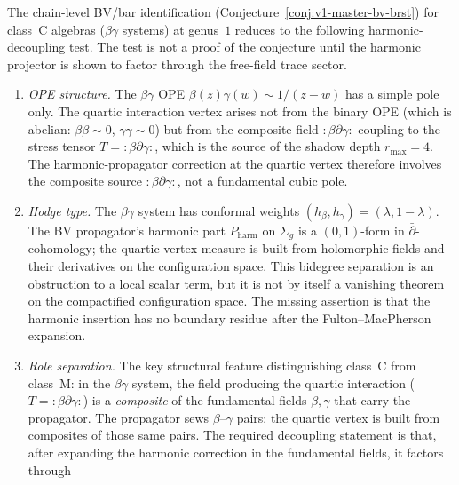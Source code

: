 \begin{remark}%
\label{rem:bv-bar-class-c-proof}%
%
%
%
The chain-level BV/bar identification
(Conjecture~\ref{conj:v1-master-bv-brst})
for class~C algebras ($\beta\gamma$ systems) at genus~$1$ reduces to
the following harmonic-decoupling test. The test is not a proof of the
conjecture until the harmonic projector is shown to factor through the
free-field trace sector.
\begin{enumerate}[label=\textup{(\roman*)},nosep]
\item \emph{OPE structure.}
 The $\beta\gamma$ OPE $\beta(z)\gamma(w)
 \sim 1/(z{-}w)$ has a simple pole only.
 The quartic interaction vertex arises not from the
 binary OPE (which is abelian: $\beta\beta \sim 0$,
 $\gamma\gamma \sim 0$) but from the composite field
 $:\!\beta\partial\gamma\!:$ coupling to the stress tensor
 $T = :\!\beta\partial\gamma\!:$, which is the source of the
 shadow depth $r_{\max} = 4$.
 The harmonic-propagator correction at the quartic vertex
 therefore involves the composite source
 $:\!\beta\partial\gamma\!:$, not a fundamental cubic pole.
\item \emph{Hodge type.}
 The $\beta\gamma$ system has conformal weights
 $(h_\beta, h_\gamma) = (\lambda, 1{-}\lambda)$.
 The BV propagator's harmonic part $P_{\mathrm{harm}}$
 on $\Sigma_g$ is a $(0,1)$-form in
 $\bar\partial$-cohomology;
 the quartic vertex measure is built from holomorphic fields and their
 derivatives on the configuration space. This bidegree separation is an
 obstruction to a local scalar term, but it is not by itself a
 vanishing theorem on the compactified configuration space. The missing
 assertion is that the harmonic insertion has no boundary residue after
 the Fulton--MacPherson expansion.
\item \emph{Role separation.}
 The key structural feature distinguishing class~C from
 class~M: in the $\beta\gamma$ system, the field producing
 the quartic interaction ($T = :\!\beta\partial\gamma\!:$)
 is a \emph{composite} of the fundamental fields
 $\beta, \gamma$ that carry the propagator.
 The propagator sews $\beta$--$\gamma$ pairs;
 the quartic vertex is built from composites of those
 same pairs. The required decoupling statement is that, after expanding
 the harmonic correction in the fundamental fields, it factors through

\end{enumerate}
\end{remark}
